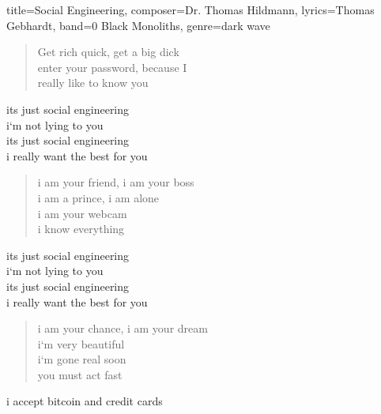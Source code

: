 \documentclass[10pt, a5paper]{article}
\begin{document}
 

\begin{song}{
    title={Social Engineering},
    composer={Dr. Thomas Hildmann},
    lyrics={Thomas Gebhardt},
    band={0 Black Monoliths},
    genre={dark wave}}  

  \begin{verse}
    Get rich quick, get a big dick \\
    enter your password, because I \\
    really like to know you \\
  \end{verse}

  \begin{chorus}
    its just social engineering \\
    i‘m  not lying to you \\
    its just social engineering \\
    i really want the best for you \\
  \end{chorus}

  \begin{verse}
    i am your friend, i am your boss \\
    i am a prince,  i am alone \\
    i am your webcam \\
    i know everything \\
  \end{verse}

  \begin{chorus}
    its just social engineering \\
    i‘m  not lying to you \\
    its just social engineering \\
    i really want the best for you \\
  \end{chorus}

  \begin{verse}
    i am your chance, i am your dream \\
    i‘m very beautiful \\
    i‘m gone real soon \\
    you must  act fast \\
  \end{verse}

  i accept bitcoin and credit cards

\end{song}
\end{document}
